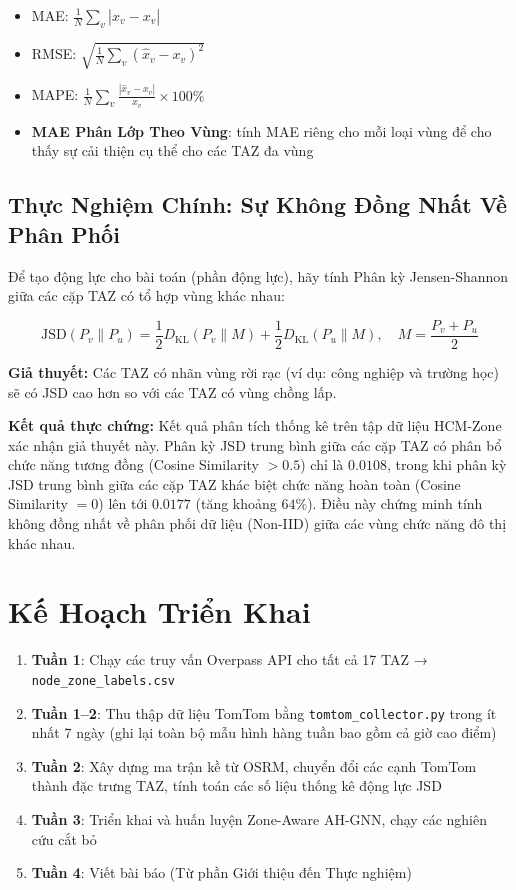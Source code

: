 \documentclass[12pt,a4paper]{article}
\begin{document}
\begin{itemize}
    \item MAE: $\frac{1}{N}\sum_v |\hat{x}_v - x_v|$
    \item RMSE: $\sqrt{\frac{1}{N}\sum_v (\hat{x}_v - x_v)^2}$
    \item MAPE: $\frac{1}{N}\sum_v \frac{|\hat{x}_v - x_v|}{x_v} \times 100\%$
    \item \textbf{MAE Phân Lớp Theo Vùng}: tính MAE riêng cho mỗi loại vùng
          để cho thấy sự cải thiện cụ thể cho các TAZ đa vùng
\end{itemize}

\subsection{Thực Nghiệm Chính: Sự Không Đồng Nhất Về Phân Phối}

Để tạo động lực cho bài toán (phần động lực), hãy tính Phân kỳ Jensen-Shannon
giữa các cặp TAZ có tổ hợp vùng khác nhau:

\begin{equation}
\text{JSD}(P_v \| P_u) = \frac{1}{2} D_{\text{KL}}(P_v \| M) + \frac{1}{2} D_{\text{KL}}(P_u \| M),
\quad M = \frac{P_v + P_u}{2}
\end{equation}

\textbf{Giả thuyết:} Các TAZ có nhãn vùng rời rạc (ví dụ: công nghiệp và trường học)
sẽ có JSD cao hơn so với các TAZ có vùng chồng lấp.

\textbf{Kết quả thực chứng:} Kết quả phân tích thống kê trên tập dữ liệu HCM-Zone xác nhận giả thuyết này.
Phân kỳ JSD trung bình giữa các cặp TAZ có phân bổ chức năng tương đồng (Cosine Similarity $> 0.5$) chỉ là $0.0108$,
trong khi phân kỳ JSD trung bình giữa các cặp TAZ khác biệt chức năng hoàn toàn (Cosine Similarity $= 0$) lên tới $0.0177$ (tăng khoảng $64\%$).
Điều này chứng minh tính không đồng nhất về phân phối dữ liệu (Non-IID) giữa các vùng chức năng đô thị khác nhau.

\section{Kế Hoạch Triển Khai}

\begin{enumerate}
    \item \textbf{Tuần 1}: Chạy các truy vấn Overpass API cho tất cả 17 TAZ → \texttt{node\_zone\_labels.csv}
    \item \textbf{Tuần 1--2}: Thu thập dữ liệu TomTom bằng \texttt{tomtom\_collector.py}
          trong ít nhất 7 ngày (ghi lại toàn bộ mẫu hình hàng tuần bao gồm cả giờ cao điểm)
    \item \textbf{Tuần 2}: Xây dựng ma trận kề từ OSRM, chuyển đổi các cạnh TomTom thành
          đặc trưng TAZ, tính toán các số liệu thống kê động lực JSD
    \item \textbf{Tuần 3}: Triển khai và huấn luyện Zone-Aware AH-GNN, chạy các nghiên cứu cắt bỏ
    \item \textbf{Tuần 4}: Viết bài báo (Từ phần Giới thiệu đến Thực nghiệm)
\end{enumerate}
\end{document}
